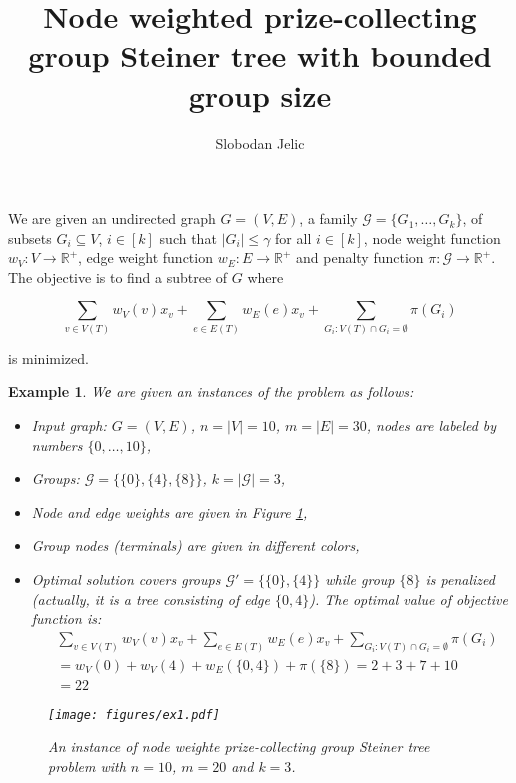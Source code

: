 \documentclass[a4paper,11pt]{article}
\title{Node weighted prize-collecting group Steiner tree with bounded group size}
\author{Slobodan Jelic}
\newtheorem{example}[section]{Example}
\begin{document}
\maketitle

We are given an undirected graph $G=\left(V,E\right)$, a family $\mathcal{G}=\{G_1,\ldots,$$G_k\}$, of subsets $G_i\subseteq V$, $i\in\left[k\right]$ such that $\left|G_i\right|\le\gamma$ for all $i\in\left[k\right]$, node weight function $w_V:V\rightarrow\mathbb{R}^+$, edge weight function $w_E:E\rightarrow\mathbb{R}^+$ and pe\-nal\-ty function $\pi:\mathcal{G}\rightarrow\mathbb{R}^+$. The objective is to find a subtree of $G$ where

$$\sum_{v\in V\left(T\right)}{w_V\left(v\right)x_v}+\sum_{e\in E\left(T\right)}{w_E\left(e\right)x_v}+\sum_{G_i:V\left(T\right)\cap G_i=\emptyset}\pi\left(G_i\right)$$

is minimized.

\begin{example} Wе are given an instances of the problem as follows:
    \begin{itemize}
        \item Input graph: $G=(V,E)$, $n=|V|=10$, $m=|E|=30$, nodes are labeled by numbers $\{0,\ldots,10\}$,
        \item Groups: $\mathcal{G}=\{\{0\},\{4\},\{8\}\}$, $k=|\mathcal{G}|=3$,
        \item Node and edge weights are given in Figure \ref{fig01},
        \item Group nodes (terminals) are given in different colors,
        \item Optimal solution covers groups $\mathcal{G}'=\{\{0\},\{4\}\}$ while group $\{8\}$ is penalized (actually, it is a tree consisting of edge $\{0,4\}$). The optimal value of objective function is:
        \begin{align*}
            &\sum_{v\in V\left(T\right)}{w_V\left(v\right)x_v}+\sum_{e\in E\left(T\right)}{w_E\left(e\right)x_v}+\sum_{G_i:V\left(T\right)\cap G_i=\emptyset}\pi\left(G_i\right)\\
            &=w_V(0) + w_V(4) + w_E(\{0,4\}) + \pi(\{8\}) = 2 + 3 +7 + 10\\
            &=22
            \end{align*}
        \end{itemize}
    \begin{figure}
        \texttt{[image: figures/ex1.pdf]}
        \caption{An instance of node weighte prize-collecting group Steiner tree problem with $n=10$, $m=20$ and $k=3$.}\label{fig01}
    \end{figure}
\end{example}
\end{document}
